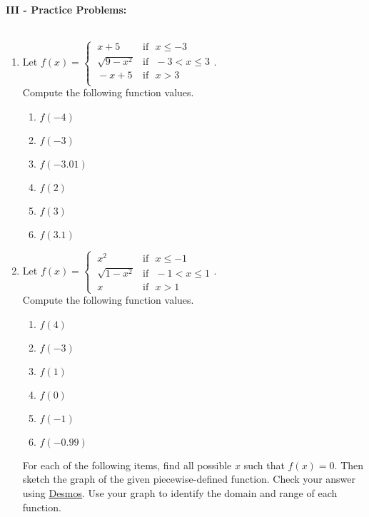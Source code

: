 \documentclass[12pt]{article}
\theoremstyle{definition}
\newcommand{\Desmos}{\href{https://www.desmos.com/}{Desmos}}
\begin{document}
{\bf III - Practice Problems:}\\
\ \par
\begin{enumerate}
\item  Let $f(x) = 	\begin{cases} 
      ~x + 5 & \text{if~~} x \leq -3 \\
			~\sqrt{9-x^2} & \text{if~~} -3 < x \leq 3 \\
			~-x+5 & \text{if~~} x > 3 \\
			\end{cases}.$\\
Compute the following function values.
\begin{multicols}{3}
\begin{enumerate}
\item $f(-4)$
\item  $f(-3)$
\item  $f(-3.01)$
\item  $f(2)$
\item  $f(3)$
\item  $f(3.1)$
\end{enumerate}
\end{multicols}

\item Let $f(x) = \begin{cases}
~x^{2} & \text{if~~} x \leq -1\\
~\sqrt{1 - x^{2}} & \text{if~~} -1 < x \leq 1\\
~x & \text{if~~} x > 1
\end{cases}.$\\
Compute the following function values.
\begin{multicols}{3}
\begin{enumerate}
\item $f(4)$
\item $f(-3)$
\item $f(1)$
\item $f(0)$
\item $f(-1)$
\item $f(-0.99)$
\end{enumerate}
\end{multicols}

For each of the following items, find all possible $x$ such that $f(x)=0$. Then sketch the graph of the given piecewise-defined function. Check your answer using \Desmos.  Use your graph to identify the domain and range of each function.


\end{enumerate}
\end{document}
